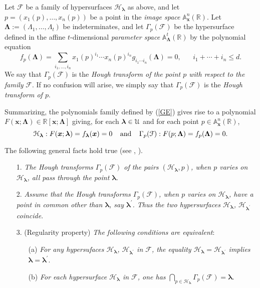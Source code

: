 \documentclass[10pt]{article}
\newcommand\sU{{\cal U}}
\newcommand{\x}{{\bm x}}
\newcommand\R{{\mathbb R}}
\newtheorem{definition}[theorem]{Definition}
\newenvironment{definition*}{\begin{definition}\em}{\end{definition}}
\begin{document}
{\begin{definition*}\label{def1}
Let  $\mathcal{F}$ be a family of hypersurfaces  ${\mathcal{H}}_{\bm \lambda}$ as above, 
and let $p=(x_1(p),\ldots, x_n(p))$ be a point in the {\em image space}  ${\mathbb A}_{\x}^n(\R)$. 
Let ${\bm \Lambda}:=(\Lambda_1,\ldots,\Lambda_t)$ be indeterminates, and let
${\Gamma}_p(\mathcal{F})$ be the hypersurface defined in the affine $t$-dimensional {\em parameter space} 
${\mathbb A}_{\bm \Lambda}^t(\R)$ by the polynomial equation 
$$f_p(\bm \Lambda) =
\sum_{i_1,\ldots,i_n} x_1(p)^{i_1} \cdots  x_n(p)^{i_n}g_{i_1\cdots i_n}({\bm \Lambda})=0, \;\;\;\;\;\; i_1+\cdots+i_n\leq d. 
$$ 
We say that ${\Gamma}_p(\mathcal{F})$ is the {\em Hough transform of the point $p$ 
with respect to the family} $\mathcal{F}$.  
If no confusion will arise, we simply say that ${\Gamma}_p(\mathcal{F})$ 
is the {\em Hough transform of $p$}. 
\end{definition*}
\smallskip

Summarizing,  the polynomials family defined by (\ref{GE})  gives rise to a polynomial 
$F({\x}; {\bm \Lambda})\in \R[{\x}; {\bm \Lambda}]$ giving, for each ${\bm \lambda} \in\sU$ 
and for each point $p \in {\mathbb A}_{\x}^n(\R)$, 
$$
{\mathcal{H}}_{\bm \lambda} : F({\x};{\bm \lambda})=f_{\bm \lambda}({\x})=0 \;\;\;\;
{\rm and}
\;\;\;\;
{\Gamma}_p(\mathcal{F}) : F(p; {\bm \Lambda})=f_p(\bm \Lambda)=0. 
$$


The following general facts hold true (see \cite[Theorem 2.2, Lemma 2.3]{BMP}, \cite[Section 3]{BR}).
 \begin{enumerate}
\item[1.]
{\em The Hough transforms ${\Gamma}_p(\mathcal F)$ of the pairs $(\mathcal{H}_{\bm \lambda}, p)$, 
when $p$ varies on $\mathcal{H}_{\bm \lambda}$, all pass through the point ${\bm \lambda}$}.
\item[2.] {\em Assume that  the Hough transforms ${\Gamma}_p(\mathcal F)$, 
when $p$ varies on $\mathcal{H}_{\bm \lambda}$,  have  a point in common other than ${\bm \lambda}$,
say ${\bm \lambda^{\prime}}$. Thus the two hypersurfaces $\mathcal{H}_{\bm \lambda}$, 
$\mathcal{H}_{\bm \lambda^{\prime}}$ coincide}.
\item[3.]  (Regularity property)  {\em The following conditions are equivalent}:
\begin{enumerate}
\item[(a)] {\em For  any  hypersufaces  $\mathcal{H}_{\bm \lambda}$,  $\mathcal{H}_{\bm \lambda^{\prime}}$ 
in $\mathcal{F}$, the equality  $\mathcal{H}_{\bm \lambda}=\mathcal{H}_{\bm \lambda^{\prime}}$ 
implies ${\bm \lambda}={\bm \lambda^{\prime}}$}.
\item[(b)] {\em For each  hypersurface $ \mathcal{H}_{\bm \lambda}$ in $\mathcal{F}$, one has
$\bigcap_{p\in \mathcal{H}_{\bm \lambda}}{\Gamma}_p(\mathcal F)={\bm \lambda}$}.
\end{enumerate} 
\end{enumerate}


}
\end{document}
